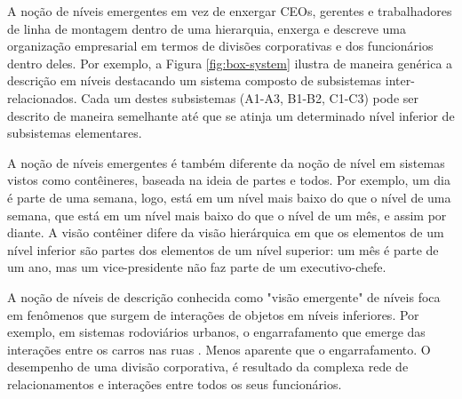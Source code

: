     A noção de níveis emergentes em vez de enxergar CEOs, gerentes e trabalhadores de linha de montagem dentro de uma hierarquia, enxerga e descreve uma organização empresarial em termos de divisões corporativas e dos funcionários dentro deles. Por exemplo, a Figura \ref{fig:box-system} ilustra de maneira genérica a descrição em níveis destacando um sistema composto de subsistemas inter-relacionados. Cada um destes subsistemas (A1-A3, B1-B2, C1-C3) pode ser descrito de maneira semelhante até que se atinja um determinado nível inferior de subsistemas elementares.
    
    \begin{figure}[h!]
        \centering
    \end{figure}
    
    A noção de níveis emergentes é também diferente da noção de nível em sistemas vistos como contêineres, baseada na ideia de partes e todos. Por exemplo, um dia é parte de uma semana, logo, está em um nível mais baixo do que o nível de uma semana, que está em um nível mais baixo do que o nível de um mês, e assim por diante. A visão contêiner difere da visão hierárquica em que os elementos de um nível inferior são partes dos elementos de um nível superior: um mês é parte de um ano, mas um vice-presidente não faz parte de um executivo-chefe. 
    
    A noção de níveis de descrição conhecida como "visão emergente" de níveis foca em fenômenos que surgem de interações de objetos em níveis inferiores. Por exemplo, em sistemas rodoviários urbanos, o engarrafamento que emerge das interações entre os carros nas ruas \cite{wilensky1999thinking}. Menos aparente que o engarrafamento. O desempenho de uma divisão corporativa, é resultado da complexa rede de relacionamentos e interações entre todos os seus funcionários. %
    
